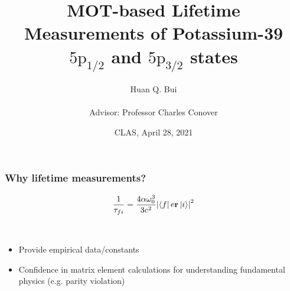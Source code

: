 \documentclass{beamer}
\title[\textcolor{white}{MOT-based Lifetime Measurements...}]
{
	MOT-based Lifetime Measurements of Potassium-39 $\text{5p}_\text{1/2}$ and $\text{5p}_\text{3/2}$ states
}
\author[Bui] %
{Huan Q. Bui \\
	$\,$ \\
	Advisor: Professor Charles Conover}
\institute[Colby College] %
{
}
\date{CLAS, April 28, 2021}
\theoremstyle{definition}
\begin{document}
 
\frame{\titlepage}




 




\begin{frame}
\frametitle{Why lifetime measurements?}


\begin{equation*}
\frac{1}{\tau_{fi}} = \frac{4\alpha \omega_0^3}{3c^2}\abs{ \bra{f} e \mathbf{r} \ket{i}}^2
\end{equation*}


$\,$\\


\begin{itemize}
	\item Provide empirical data/constants
	\item Confidence in matrix element calculations for understanding fundamental physics (e.g. parity violation)
\end{itemize}


\end{frame}
\end{document}
